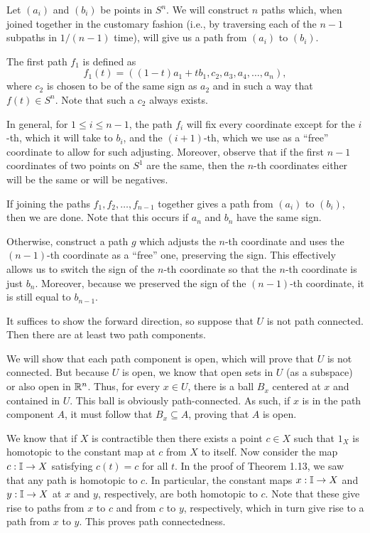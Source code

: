 \documentclass[../solutions.tex]{subfiles}
\begin{document}
\begin{exercise} \leavevmode
Let $(a_i)$ and $(b_i)$ be points in $S^n$. We will construct $n$ paths which, when joined together in the customary fashion (i.e., by traversing each of the $n-1$ subpaths in $1/(n-1)$ time), will give us a path from $(a_i)$ to $(b_i)$. 

The first path $f_1$ is defined as \[f_1(t)=((1-t)a_1+tb_1,c_2,a_3,a_4,\dots,a_n),\] where $c_2$ is chosen to be of the same sign as $a_2$ and in such a way that $f(t)\in S^n$. Note that such a $c_2$ always exists. 

In general, for $1\le i\le n-1$, the path $f_i$ will fix every coordinate except for the $i$-th, which it will take to $b_i$, and the $(i+1)$-th, which we use as a ``free'' coordinate to allow for such adjusting. Moreover, observe that if the first $n-1$ coordinates of two points on $S^1$ are the same, then the $n$-th coordinates either will be the same or will be negatives. 

If joining the paths $f_1,f_2,\dots,f_{n-1}$ together gives a path from $(a_i)$ to $(b_i)$, then we are done. Note that this occurs if $a_n$ and $b_n$ have the same sign. 

Otherwise, construct a path $g$ which adjusts the $n$-th coordinate and uses the $(n-1)$-th coordinate as a ``free'' one, preserving the sign. This effectively allows us to switch the sign of the $n$-th coordinate so that the $n$-th coordinate is just $b_n$. Moreover, because we preserved the sign of the $(n-1)$-th coordinate, it is still equal to $b_{n-1}$. 
\end{exercise} 

\begin{exercise} \leavevmode
It suffices to show the forward direction, so suppose that $U$ is not path connected. Then there are at least two path components. 

We will show that each path component is open, which will prove that $U$ is not connected. But because $U$ is open, we know that open sets in $U$ (as a subspace) or also open in $\mathbb{R}^n$. Thus, for every $x\in U$, there is a ball $B_x$ centered at $x$ and contained in $U$. This ball is obviously path-connected. As such, if $x$ is in the path component $A$, it must follow that $B_x\subseteq A$, proving that $A$ is open. 
\end{exercise} 

\begin{exercise} \leavevmode
We know that if $X$ is contractible then there exists a point $c\in X$ such that $1_X$ is homotopic to the constant map at $c$ from $X$ to itself. Now consider the map $c:\mathbb I\to X$ satisfying $c(t)=c$ for all $t$. In the proof of Theorem 1.13, we saw that any path is homotopic to $c$. In particular, the constant maps $x:\mathbb I\to X$ and $y:\mathbb I\to X$ at $x$ and $y$, respectively, are both homotopic to $c$. Note that these give rise to paths from $x$ to $c$ and from $c$ to $y$, respectively, which in turn give rise to a path from $x$ to $y$. This proves path connectedness. 
\end{exercise} 
\end{document}
